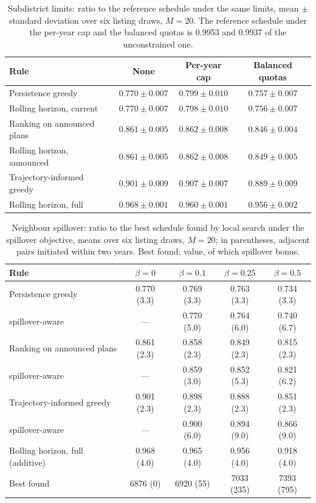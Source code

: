\begin{table}[H]
\centering
\caption{Subdistrict limits: ratio to the reference schedule under the same limits, mean $\pm$ standard deviation over six listing draws, $M = 20$. The reference schedule under the per-year cap and the balanced quotas is 0.9953 and 0.9937 of the unconstrained one.}
\label{tab:E1}
\footnotesize
\begin{tabular}{@{}lccc@{}}
\toprule
Rule & None & Per-year cap & Balanced quotas \\
\midrule
Persistence greedy & $0.770 \pm 0.007$ & $0.799 \pm 0.010$ & $0.757 \pm 0.007$ \\
Rolling horizon, current & $0.770 \pm 0.007$ & $0.798 \pm 0.010$ & $0.756 \pm 0.007$ \\
Ranking on announced plans & $0.861 \pm 0.005$ & $0.862 \pm 0.008$ & $0.846 \pm 0.004$ \\
Rolling horizon, announced & $0.861 \pm 0.005$ & $0.862 \pm 0.008$ & $0.849 \pm 0.005$ \\
Trajectory-informed greedy & $0.901 \pm 0.009$ & $0.907 \pm 0.007$ & $0.889 \pm 0.009$ \\
Rolling horizon, full & $0.968 \pm 0.001$ & $0.960 \pm 0.001$ & $0.956 \pm 0.002$ \\
\bottomrule
\end{tabular}
\end{table}

\begin{table}[H]
\centering
\caption{Neighbour spillover: ratio to the best schedule found by local search under the spillover objective, means over six listing draws, $M = 20$; in parentheses, adjacent pairs initiated within two years. Best found: value, of which spillover bonus.}
\label{tab:E2}
\footnotesize
\begin{tabular}{@{}lcccc@{}}
\toprule
Rule & $\beta = 0$ & $\beta = 0.1$ & $\beta = 0.25$ & $\beta = 0.5$ \\
\midrule
Persistence greedy & 0.770 (3.3) & 0.769 (3.3) & 0.763 (3.3) & 0.734 (3.3) \\
\quad spillover-aware & --- & 0.770 (5.0) & 0.764 (6.0) & 0.740 (6.7) \\
Ranking on announced plans & 0.861 (2.3) & 0.858 (2.3) & 0.849 (2.3) & 0.815 (2.3) \\
\quad spillover-aware & --- & 0.859 (3.0) & 0.852 (5.3) & 0.821 (6.2) \\
Trajectory-informed greedy & 0.901 (2.3) & 0.898 (2.3) & 0.888 (2.3) & 0.851 (2.3) \\
\quad spillover-aware & --- & 0.900 (6.0) & 0.894 (9.0) & 0.866 (9.0) \\
Rolling horizon, full (additive) & 0.968 (4.0) & 0.965 (4.0) & 0.956 (4.0) & 0.918 (4.0) \\
Best found & 6876 (0) & 6920 (55) & 7033 (235) & 7393 (795) \\
\bottomrule
\end{tabular}
\end{table}

